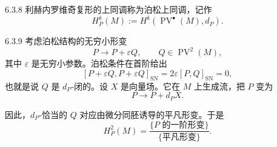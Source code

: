 \begin{definition}{6.3.8}
  利赫内罗维奇复形的上同调称为泊松上同调，记作
  \[
  H_P^k(M):=H^k(\operatorname{PV}^\bullet(M),d_P).
  \]
\end{definition}

\begin{example}{6.3.9}
  考虑泊松结构的无穷小形变
  \[
  P\longrightarrow P+\varepsilon Q,\qquad Q\in\operatorname{PV}^2(M),
  \]
  其中 $\varepsilon$ 是无穷小参数。泊松条件在首阶给出
  \[
  [P+\varepsilon Q,P+\varepsilon Q]_{\mathrm{SN}}=2\varepsilon[P,Q]_{\mathrm{SN}}=0,
  \]
  也就是说 $Q$ 是 $d_P$-闭的。设 $X$ 是向量场。它在 $M$ 上生成流，把 $P$ 变为
  \[
  P\longrightarrow P+d_PX.
  \]

  因此，$d_P$-恰当的 $Q$ 对应由微分同胚诱导的平凡形变。于是
  \[
  H_P^2(M)=\frac{\{\text{$P$ 的一阶形变}\}}{\{\text{平凡形变}\}}.
  \]
\end{example}

